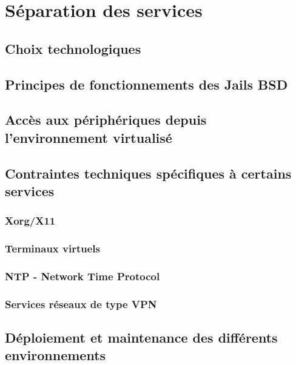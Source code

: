 \documentclass[a4paper,10pt]{report}
\begin{document}
\pagebreak

\section{S\'eparation des services}
\begin{multicols}{2}

\subsection{Choix technologiques}
\lipsum
\subsection{Principes de fonctionnements des Jails BSD}
\lipsum
\subsection{Acc\`es aux p\'eriph\'eriques depuis\\ l'environnement virtualis\'e}
\subsection{Contraintes techniques sp\'ecifiques \`a certains services}
\subsubsection{Xorg/X11}
\lipsum
\subsubsection{Terminaux virtuels}
\subsubsection{NTP - Network Time Protocol}
\subsubsection{Services r\'eseaux de type VPN}
\subsection{D\'eploiement et maintenance des diff\'erents environnements}

\end{multicols}
\pagebreak
\end{document}
